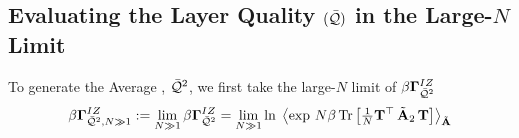 \subsection{Evaluating the Layer Quality $(\bar{\mathcal{Q}})$ in the Large-$N$ Limit}
\label{sxn:matgen_evaluation_hciz}

To generate the Average \Quality, $\bar{\mathcal{Q}}^{2}$, we first take the large-$N$ limit of $\beta\mathbf{\Gamma}^{IZ}_{\bar{\mathcal{Q}}^{2}}$
\begin{equation}
  \label{eqn:IZG_limit}
\IZGINF := \lim_{N \gg 1} \IZG 
= \lim_{N \gg 1} \ln \; 
  \Expected[\AECS]{ 
    \exp\,
      N \beta \Trace{\tfrac{1}{N}\TMAT^{\top}\,\AECS_{2}\,\TMAT}
  } 
\end{equation}
